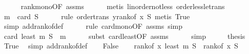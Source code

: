 \begin{isabellebody}
\ \ \ \ \isamarkupfalse%
\ rank{\isacharunderscore}{\kern0pt}mono{\isacharbrackleft}{\kern0pt}OF\ assms{\isacharbrackright}{\kern0pt}\isanewline
\ \ \ \ \isamarkupfalse%
\ {\isacharparenleft}{\kern0pt}metis\ linorder{\isacharunderscore}{\kern0pt}not{\isacharunderscore}{\kern0pt}less\ order{\isacharunderscore}{\kern0pt}less{\isacharunderscore}{\kern0pt}le{\isacharunderscore}{\kern0pt}trans{\isacharparenright}{\kern0pt}\isanewline
\ \ \isamarkupfalse%
\ \isamarkupfalse%
\ {\isachardoublequoteopen}m\ {\isasymle}\ card\ S{\isachardoublequoteclose}\isanewline
\ \ \ \ \isamarkupfalse%
\ {\isacharparenleft}{\kern0pt}rule\ order{\isacharunderscore}{\kern0pt}trans{\isacharbrackleft}{\kern0pt}\ y{\isacharequal}{\kern0pt}{\isachardoublequoteopen}rank{\isacharunderscore}{\kern0pt}of\ x\ S{\isachardoublequoteclose}{\isacharbrackright}{\kern0pt}{\isacharcomma}{\kern0pt}\ metis\ True{\isacharparenright}{\kern0pt}\isanewline
\ \ \ \ \isamarkupfalse%
\ {\isacharparenleft}{\kern0pt}simp\ add{\isacharcolon}{\kern0pt}rank{\isacharunderscore}{\kern0pt}of{\isacharunderscore}{\kern0pt}def{\isacharparenright}{\kern0pt}\isanewline
\ \ \ \ \isamarkupfalse%
\ {\isacharparenleft}{\kern0pt}rule\ card{\isacharunderscore}{\kern0pt}mono{\isacharbrackleft}{\kern0pt}OF\ assms{\isacharbrackright}{\kern0pt}{\isacharcomma}{\kern0pt}\ simp{\isacharparenright}{\kern0pt}\isanewline
\ \ \isamarkupfalse%
\ {\isachardoublequoteopen}card\ {\isacharparenleft}{\kern0pt}least\ m\ S{\isacharparenright}{\kern0pt}\ {\isacharequal}{\kern0pt}\ m{\isachardoublequoteclose}\isanewline
\ \ \ \ \isamarkupfalse%
\ {\isacharparenleft}{\kern0pt}subst\ card{\isacharunderscore}{\kern0pt}least{\isacharbrackleft}{\kern0pt}OF\ assms{\isacharbrackright}{\kern0pt}{\isacharparenright}{\kern0pt}\isanewline
\ \ \ \ \isamarkupfalse%
\ simp\isanewline
\ \ \isamarkupfalse%
\ \isamarkupfalse%
\ {\isacharquery}{\kern0pt}thesis\ \isamarkupfalse%
\ True\ \isamarkupfalse%
\ {\isacharparenleft}{\kern0pt}simp\ add{\isacharcolon}{\kern0pt}rank{\isacharunderscore}{\kern0pt}of{\isacharunderscore}{\kern0pt}def{\isacharparenright}{\kern0pt}\isanewline
{}\isamarkupfalse%
\isanewline
\ \ \isamarkupfalse%
\ False\isanewline
\ \ \isamarkupfalse%
\ {\isachardoublequoteopen}rank{\isacharunderscore}{\kern0pt}of\ x\ {\isacharparenleft}{\kern0pt}least\ m\ S{\isacharparenright}{\kern0pt}\ {\isacharequal}{\kern0pt}\ rank{\isacharunderscore}{\kern0pt}of\ x\ S{\isachardoublequoteclose}\ \isanewline

\end{isabellebody}
